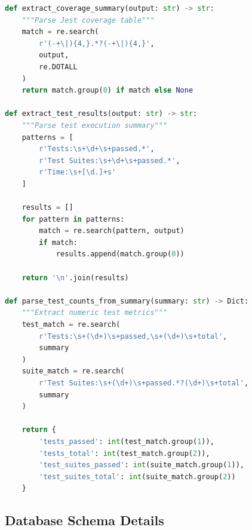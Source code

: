 \begin{lstlisting}[language=Python, caption=Test Results Parsing]
def extract_coverage_summary(output: str) -> str:
    """Parse Jest coverage table"""
    match = re.search(
        r'(-+\|){4,}.*?(-+\|){4,}', 
        output, 
        re.DOTALL
    )
    return match.group(0) if match else None

def extract_test_results(output: str) -> str:
    """Parse test execution summary"""
    patterns = [
        r'Tests:\s+\d+\s+passed.*',
        r'Test Suites:\s+\d+\s+passed.*',
        r'Time:\s+[\d.]+s'
    ]
    
    results = []
    for pattern in patterns:
        match = re.search(pattern, output)
        if match:
            results.append(match.group(0))
    
    return '\n'.join(results)

def parse_test_counts_from_summary(summary: str) -> Dict:
    """Extract numeric test metrics"""
    test_match = re.search(
        r'Tests:\s+(\d+)\s+passed,\s+(\d+)\s+total',
        summary
    )
    suite_match = re.search(
        r'Test Suites:\s+(\d+)\s+passed.*?(\d+)\s+total',
        summary
    )
    
    return {
        'tests_passed': int(test_match.group(1)),
        'tests_total': int(test_match.group(2)),
        'test_suites_passed': int(suite_match.group(1)),
        'test_suites_total': int(suite_match.group(2))
    }
\end{lstlisting}

\subsection{Database Schema Details}

